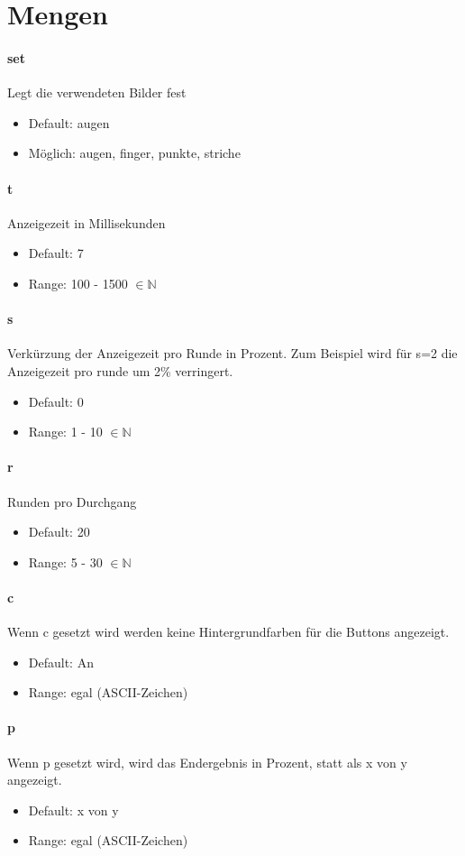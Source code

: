 \documentclass[]{article}
\begin{document}
\section{Mengen}
\begin{multicols}{2}

	\paragraph{set}  Legt die verwendeten Bilder fest
	\begin{itemize}
		\item Default: augen
		\item Möglich: augen, finger, punkte, striche
	\end{itemize}

	\paragraph{t} Anzeigezeit in Millisekunden

	\begin{itemize}
		\item Default: 7
		\item Range: 100 - 1500 $\in \mathbb{N}$
	\end{itemize}

	\paragraph{s} Verkürzung der Anzeigezeit pro Runde in Prozent. Zum Beispiel wird für s=2 die Anzeigezeit pro runde um 2\% verringert.
	\begin{itemize}
		\item Default: 0
		\item Range: 1 - 10 $\in \mathbb{N}$
	\end{itemize}

	\paragraph{r}  Runden pro Durchgang
	\begin{itemize}
		\item Default: 20
		\item Range: 5 - 30 $\in \mathbb{N}$
	\end{itemize}

	\paragraph{c}  Wenn c gesetzt wird werden keine Hintergrundfarben für die Buttons angezeigt.
	\begin{itemize}
		\item Default: An
		\item Range: egal (ASCII-Zeichen)
	\end{itemize}

	\paragraph{p}  Wenn p gesetzt wird, wird das Endergebnis in Prozent, statt als x von y angezeigt.
	\begin{itemize}
		\item Default: x von y
		\item Range: egal (ASCII-Zeichen)
	\end{itemize}

	\end{multicols}
\end{document}
